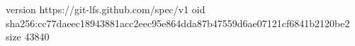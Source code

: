 version https://git-lfs.github.com/spec/v1
oid sha256:cc77daeec18943881acc2eec95e864dda87b47559d6ae07121cf6841b2120be2
size 43840
